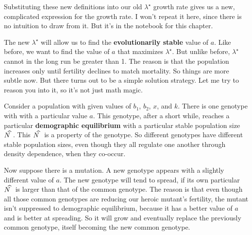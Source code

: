 \documentclass[10pt,reqno]{amsbook}
\newcommand*{\xwidehat}[2]{#2\kern#1\widehat{\phantom{#2}}}
\newcommand{\bemph}[1]{{\textbf{\textcolor{bemphcol}{#1}}}}
\numberwithin{equation}{chapter}
\begin{document}
Substituting these new definitions into our old $\lambda^{\!\star}$ growth rate gives us a new, complicated expression for the growth rate. I won't repeat it here, since there is no intuition to draw from it. But it's in the notebook for this chapter. 

The new $\lambda^{\!\star}$ will allow us to find the \bemph{evolutionarily stable} value of $a$. Like before, we want to find the value of $a$ that maximizes $\lambda^{\!\star}$. But unlike before, $\lambda^{\!\star}$ cannot in the long run be greater than 1. The reason is that the population increases only until fertility declines to match mortality. So things are more subtle now. But there turns out to be a simple solution strategy. Let me try to reason you into it, so it's not just math magic.

Consider a population with given values of $b_1$, $b_2$, $x$, and $k$. There is one genotype with with a particular value $a$. This genotype, after a short while, reaches a particular \bemph{demographic equilibrium} with a particular stable population size $\xwidehat{-0.57em}{N}$. This $\xwidehat{-0.57em}{N}$ is a property of the genotype. So different genotypes have different stable population sizes, even though they all regulate one another through density dependence, when they co-occur.

Now suppose there is a mutation. A new genotype appears with a slightly different value of $a$. The new genotype will tend to spread, if its own particular $\xwidehat{-0.57em}{N}$ is larger than that of the common genotype. The reason is that even though all those common genotypes are reducing our heroic mutant's fertility, the mutant isn't suppressed to demographic equilibrium, because it has a better value of $a$ and is better at spreading. So it will grow and eventually replace the previously common genotype, itself becoming the new common genotype.
\end{document}
